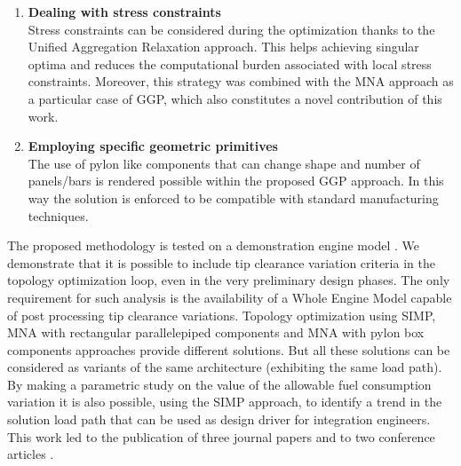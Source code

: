 \begin{enumerate}
	\item \textbf{Dealing with stress constraints}\\
	Stress constraints can be considered during the optimization thanks to the Unified Aggregation Relaxation approach. This helps achieving singular optima and reduces the computational burden associated with local stress constraints. Moreover, this strategy was combined with the MNA approach as a particular case of GGP, which also constitutes a novel contribution of this work.
	\item \textbf{Employing specific geometric primitives}\\
	The use of pylon like components that can change shape and number of panels/bars is rendered possible within the proposed GGP approach. In this way the solution is enforced to be compatible with standard manufacturing techniques. 
\end{enumerate}
The proposed methodology is tested on a demonstration engine model \cite{coniglio2019enginepylon}.
We demonstrate that it is possible to include tip clearance variation criteria in the topology optimization loop, even in the very preliminary design phases. The only requirement for such analysis is the availability of a Whole Engine Model capable of post processing tip clearance variations.
Topology optimization using SIMP, MNA with rectangular parallelepiped components and MNA with pylon box components approaches provide different solutions. But all these solutions can be considered as variants of the same architecture (exhibiting the same load path). By making a parametric study on the value of the allowable fuel consumption variation it is also possible, using the SIMP approach, to identify a trend in the solution load path that can be used as design driver for integration engineers.
This work led to the publication of three journal papers \cite{coniglio2018weighted,coniglio2019enginepylon,coniglio2019generalized} and to two conference articles \cite{coniglio2017pylon,coniglio2018original}.
